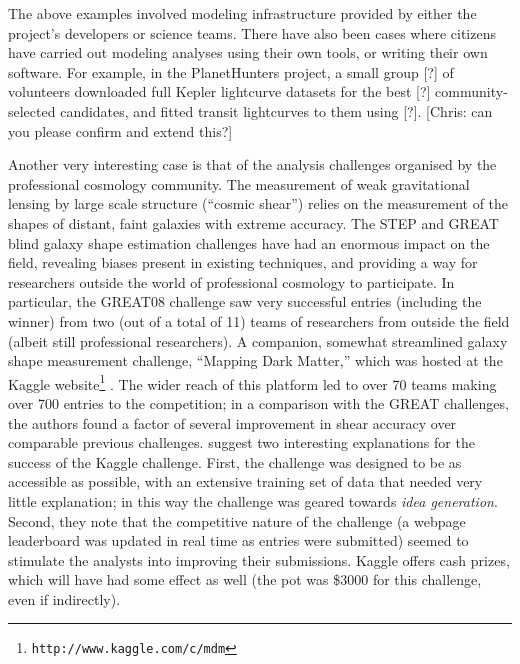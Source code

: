 \documentclass{ar2e}
\begin{document}
The above examples involved modeling infrastructure provided by either the
project's developers or science teams. There have also been cases where
citizens have carried out modeling analyses using their own tools, or writing
their own software. For example, in the PlanetHunters project, a small group
[?] of volunteers downloaded full Kepler lightcurve datasets for the best [?]
community-selected candidates, and fitted transit lightcurves to them using
[?]. [Chris: can you please confirm and extend this?]

Another very interesting case is that of the analysis challenges organised by
the professional cosmology community.  The measurement of weak gravitational
lensing by large scale structure (``cosmic shear'') relies on the measurement
of the shapes of distant, faint galaxies with extreme accuracy. The STEP
\citep{HeymansEtal2006,MasseyEtal2007} and GREAT
\citep{BridleEtal2010,KitchingEtal2012,KitchingEtal2013a} blind galaxy shape
estimation challenges have had an enormous impact on the field, revealing
biases present in existing techniques, and providing a way for researchers
outside the world of professional cosmology to participate. In particular, the
GREAT08 challenge saw very successful entries (including the winner) from two
(out of a total of 11) teams of researchers from outside the field (albeit
still professional researchers). A companion, somewhat streamlined galaxy
shape measurement challenge, ``Mapping Dark Matter,'' which was hosted at the
Kaggle website\footnote{\texttt{http://www.kaggle.com/c/mdm}} 
\citep{KitchingEtal2013b}. The wider reach of this platform led to over 70
teams making over 700 entries to the competition; in a comparison with the
GREAT challenges, the authors found a factor of several improvement in shear
accuracy over comparable previous challenges. \citet{KitchingEtal2013b}
suggest two interesting explanations for the success of the Kaggle challenge.
First, the challenge was designed to be as accessible as possible, with an
extensive training set of data that needed very little explanation; in this
way the challenge was geared towards {\it idea generation}. Second, they note
that the competitive  nature of the challenge (a webpage leaderboard was
updated in real time as entries were submitted) seemed to stimulate the
analysts into improving their submissions. Kaggle offers cash prizes, which
will have had some effect as well (the pot
was \$3000 for this challenge, even if indirectly).
\end{document}
